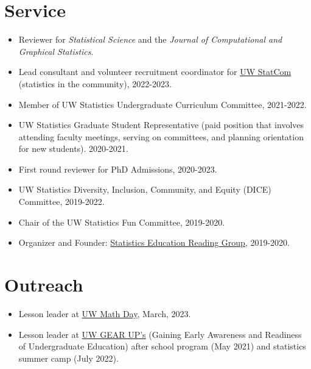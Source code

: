 \documentclass[margin, 10pt]{res} %
\begin{document}
\begin{resume}
\section{Service}
\begin{itemize}
\item Reviewer for \textit{Statistical Science} and the \textit{Journal of Computational and Graphical Statistics}. 
\item Lead consultant and volunteer recruitment coordinator for \href{https://statcom.stat.washington.edu}{UW StatCom} (statistics in the community), 2022-2023. 
\item Member of UW Statistics Undergraduate Curriculum Committee, 2021-2022. 
 \item UW Statistics Graduate Student Representative (paid position that involves attending faculty meetings, serving on committees, and planning orientation for new students). 2020-2021.
    \item First round reviewer for PhD Admissions, 2020-2023. 
    \item UW Statistics Diversity, Inclusion, Community, and Equity (DICE) Committee, 2019-2022.   
    \item Chair of the UW Statistics Fun Committee, 2019-2020.
    \item Organizer and Founder: \href{https://pearce790.github.io}{Statistics Education Reading Group}, 2019-2020.
 \end{itemize}
 
 
 \section{Outreach}
 \begin{itemize}
    \item Lesson leader at \href{https://math.washington.edu/events/2023-03-20/uw-math-day}{UW Math Day}, March, 2023. 
   \item Lesson leader at \href{https://depts.washington.edu/gearupac/}{UW GEAR UP's} (Gaining Early Awareness and Readiness of Undergraduate Education) after school program (May 2021) and statistics summer camp (July 2022). 
   \end{itemize}
   
\end{resume}
\end{document}
